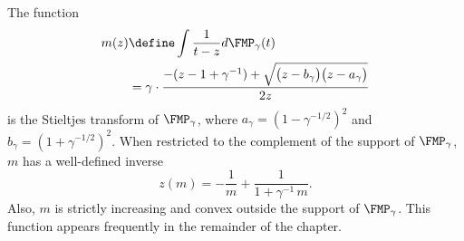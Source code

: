 The function
\begin{align}
    m(z)
        &\define
            \int
                \frac{1}{t - z} d\FMP_\gamma(t) \notag \\
        &=
            \gamma
            \cdot
            \frac{ -(z - 1 + \gamma^{-1})
                   +\sqrt{ \big( z - b_\gamma \big) 
                           \big( z - a_\gamma \big) } }
                 { 2 z }
\end{align}
is the Stieltjes transform of $\FMP_\gamma$, 
where
\(
    a_\gamma = \left( 1 - \gamma^{-1/2} \right)^2
\)
and
\(
    b_\gamma = \left( 1 + \gamma^{-1/2} \right)^2.
\)
When restricted to the complement of the support of $\FMP_\gamma$, $m$ has a well-defined inverse
\begin{equation}\label{E:stieltjes-inverse}
    z(m)
        = 
            -
            \frac{1}{m}
            +
            \frac{1}{1 + \gamma^{-1} \, m}.
\end{equation}
Also, $m$ is strictly increasing and convex outside the support of
$\FMP_\gamma$.  This function appears frequently in the remainder of the chapter.

